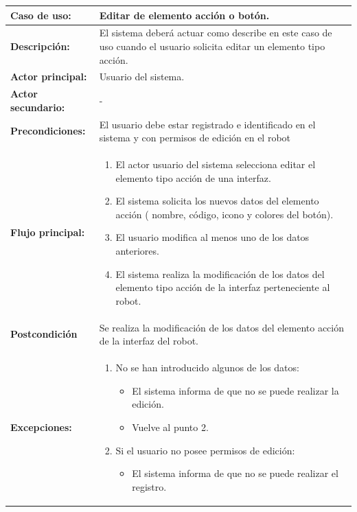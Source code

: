 \begin{table}[H]
  \begin{center}
    \begin{tabular}{|p{3.5cm}|p{10cm}|}
      \hline
      {\textbf{Caso de uso:}} & { Editar de elemento acción o botón.} \\
      \hline
      {\textbf{Descripción:}} & { El sistema deberá actuar como describe en este caso de uso cuando el usuario solicita editar un elemento tipo acción.} \\
     \hline
      {\textbf{Actor principal:}} & { Usuario del sistema.} \\
      \hline
      {\textbf{Actor secundario:}} & { - } \\
      \hline
      {\textbf{Precondiciones:}} & { El usuario debe estar registrado e identificado en el sistema y con permisos de edición en el robot} \\
     \hline   
    {\textbf{Flujo principal:}} & { 
      \begin{enumerate}
	\item El actor usuario del sistema selecciona editar el elemento tipo acción de una interfaz.
	\item El sistema solicita los nuevos datos del elemento acción ( nombre, código, icono y colores del botón).
	\item El usuario modifica al menos uno de los datos anteriores.
	\item El sistema realiza la modificación de los datos del elemento tipo acción de la interfaz perteneciente al robot.
      \end{enumerate}
      } \\
     \hline
     {\textbf{Postcondición}} & {Se realiza la modificación de los datos del elemento acción de la interfaz del robot.}\\
     \hline
      {\textbf{Excepciones:}} & {
	\begin{enumerate}
	\item No se han introducido algunos de los datos:
	\begin{itemize}
	  \item El sistema informa de que no se puede realizar la edición.
	  \item Vuelve al punto 2.
	\end{itemize}
	\item Si el usuario no posee permisos de edición:
	  \begin{itemize}
	    \item El sistema informa de que no se puede realizar el registro.

\end{itemize}
\end{enumerate}}
\end{tabular}
\end{center}
\end{table}
